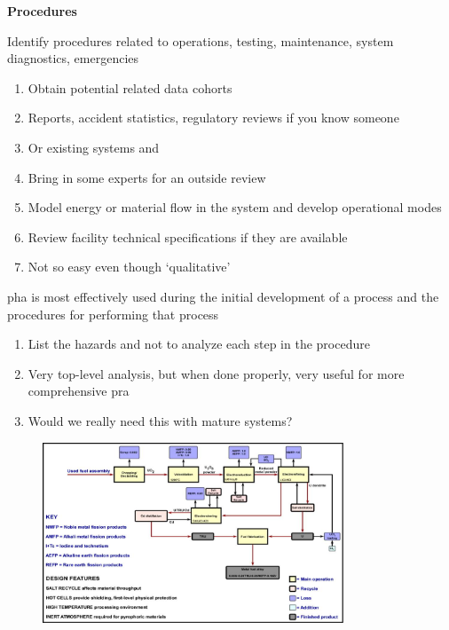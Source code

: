 \documentclass[aspectratio=1610,pdftex,dvipsnames,compress,xcolor={dvipsnames}]{beamer}
\newcommand{\acs}{\acrshort} %
\newcommand{\acsp}{\acrshortpl} %
\begin{document}
\begin{frame}[plain]{}
    \centering\LARGE\textbf{Procedures}
\end{frame}


\addtocounter{framenumber}{-1}
\begin{frame}{Identify procedures related to operations, testing, maintenance, system diagnostics, emergencies}
    \begin{enumerate}[series=outerlist,topsep=0pt,itemsep=11pt,leftmargin=*,label=(\arabic*)]
        \item[]Obtain potential related data cohorts  
        \item[]Reports, accident statistics, regulatory reviews if you know someone  
        \item[]Or existing systems and \acsp{pha}
        \item[]Bring in some experts for an outside review
        \item[]Model energy or material flow in the system and develop operational modes  
        \item[]Review facility technical specifications if they are available  
        \item[]Not so easy even though `qualitative'
    \end{enumerate}
\end{frame}


\begin{frame}{\acs{pha} is most effectively used during the initial development of a process and the procedures for performing that process}
    \begin{enumerate}[series=outerlist,topsep=0pt,itemsep=21pt,leftmargin=*,label=(\arabic*)]
        \item[]List the hazards and not to analyze each step in the procedure  
        \item[]Very top-level analysis, but when done properly, very useful for more comprehensive \acs{pra}
        \item[]Would we really need this with mature systems?
    \end{enumerate}
\end{frame}


\begin{frame}{}
    \begin{figure}
        \centering
        \includegraphics[width=0.80\textwidth]{pyroprocessing.flowsheet.jpg}
    \end{figure}
\end{frame}
\end{document}
